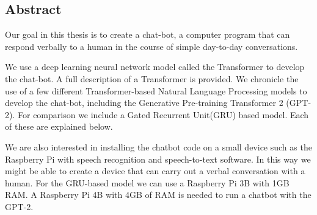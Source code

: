 
\begin{center}
	
\section*{Abstract}
\end{center}



Our goal in this thesis is to create a chat-bot, a computer program that can respond verbally to a human in the course of simple day-to-day conversations.

We use a deep learning neural network model called the Transformer to develop the chat-bot. A full description of a Transformer is provided. We chronicle  the use of a few different Transformer-based Natural Language Processing models to develop the chat-bot, including the Generative Pre-training Transformer 2 (GPT-2). For comparison we include a Gated Recurrent Unit(GRU) based model. Each of these are explained below.

We are also interested in installing the chatbot code on a small device  such as the Raspberry Pi with speech recognition and speech-to-text software. In this way we might be able to create a device that can carry out a verbal conversation with a human. For the GRU-based model we can use a Raspberry Pi 3B with 1GB RAM. A Raspberry Pi 4B with 4GB of RAM is needed to run a chatbot with the GPT-2. 


